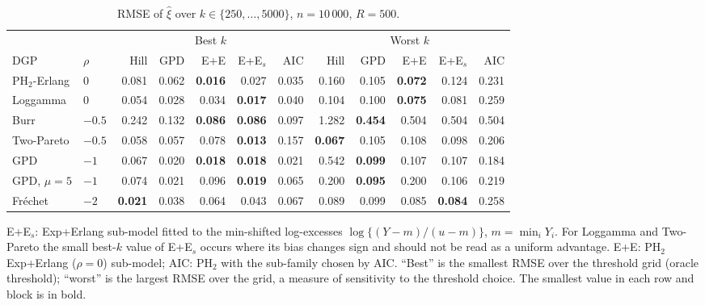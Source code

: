 \begin{table}[t]
\centering
\footnotesize
\setlength{\tabcolsep}{4pt}
\caption{RMSE of $\hat\xi$ over $k\in\{250,\dots,5000\}$, $n=10\,000$, $R=500$.}
\label{tab:xi10000}
\begin{tabular}{llrrrrrrrrrr}
\toprule
 & & \multicolumn{5}{c}{Best $k$} & \multicolumn{5}{c}{Worst $k$} \\
\cmidrule(lr){3-7} \cmidrule(lr){8-12}
DGP & $\rho$ & Hill & GPD & E+E & E+E$_s$ & AIC & Hill & GPD & E+E & E+E$_s$ & AIC \\
\midrule
PH$_2$-Erlang & $0$ & 0.081 & 0.062 & \textbf{0.016} & 0.027 & 0.035 & 0.160 & 0.105 & \textbf{0.072} & 0.124 & 0.231 \\
Loggamma & $0$ & 0.054 & 0.028 & 0.034 & \textbf{0.017} & 0.040 & 0.104 & 0.100 & \textbf{0.075} & 0.081 & 0.259 \\
Burr & $-0.5$ & 0.242 & 0.132 & \textbf{0.086} & \textbf{0.086} & 0.097 & 1.282 & \textbf{0.454} & 0.504 & 0.504 & 0.504 \\
Two-Pareto & $-0.5$ & 0.058 & 0.057 & 0.078 & \textbf{0.013} & 0.157 & \textbf{0.067} & 0.105 & 0.108 & 0.098 & 0.206 \\
GPD & $-1$ & 0.067 & 0.020 & \textbf{0.018} & \textbf{0.018} & 0.021 & 0.542 & \textbf{0.099} & 0.107 & 0.107 & 0.184 \\
GPD, $\mu=5$ & $-1$ & 0.074 & 0.021 & 0.096 & \textbf{0.019} & 0.065 & 0.200 & \textbf{0.095} & 0.200 & 0.106 & 0.219 \\
Fr\'echet & $-2$ & \textbf{0.021} & 0.038 & 0.064 & 0.043 & 0.067 & 0.089 & 0.099 & 0.085 & \textbf{0.084} & 0.258 \\
\bottomrule
\end{tabular}
\par\smallskip
\parbox{\linewidth}{\footnotesize E+E$_s$: Exp+Erlang sub-model fitted to the min-shifted log-excesses $\log\{(Y-m)/(u-m)\}$, $m=\min_i Y_i$. For Loggamma and Two-Pareto the small best-$k$ value of E+E$_s$ occurs where its bias changes sign and should not be read as a uniform advantage. E+E: PH$_2$ Exp+Erlang ($\rho=0$) sub-model; AIC: PH$_2$ with the sub-family chosen by AIC. ``Best'' is the smallest RMSE over the threshold grid (oracle threshold); ``worst'' is the largest RMSE over the grid, a measure of sensitivity to the threshold choice. The smallest value in each row and block is in bold.}
\end{table}
